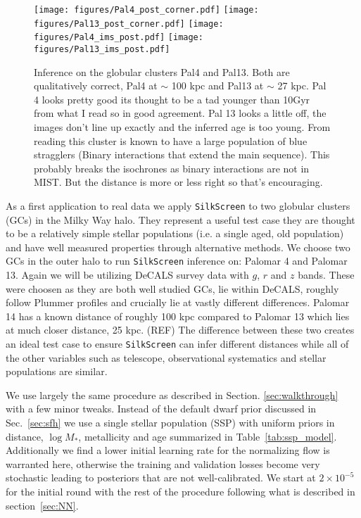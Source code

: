 \documentclass[twocolumn]{aastex631}
\newcommand{\code}[0]{\texttt{SilkScreen}}
\begin{document}
\begin{figure*}
    \centering
    \texttt{[image: figures/Pal4\_post\_corner.pdf]}
    \texttt{[image: figures/Pal13\_post\_corner.pdf]}
    \texttt{[image: figures/Pal4\_ims\_post.pdf]}
    \hspace{1cm}
    \texttt{[image: figures/Pal13\_ims\_post.pdf]}
    \caption{Inference on the globular clusters Pal4 and Pal13. Both are qualitatively correct, Pal4 at $\sim$ 100 kpc and Pal13 at $\sim$ 27 kpc. Pal 4 looks pretty good its thought to be a tad younger than 10Gyr from what I read so in good agreement. Pal 13 looks a little off, the images don't line up exactly and the inferred age is too young. From reading this cluster is known to have a large population of blue stragglers (Binary interactions that extend the main sequence). This probably breaks the isochrones as binary interactions are not in MIST. But the distance is more or less right so that's encouraging.}
    \label{fig:GCs}
\end{figure*}

As a first application to real data we apply \code{} to two globular clusters (GCs) in the Milky Way halo. They represent a useful test case they are thought to be a relatively simple stellar populations (i.e. a single aged, old population) and have well measured properties through alternative methods. We choose two GCs in the outer halo to run \code{} inference on: Palomar 4 and Palomar 13. Again we will be utilizing DeCALS survey data with $g$, $r$ and $z$ bands. These were choosen as they are both well studied GCs, lie within DeCALS, roughly follow Plummer profiles and crucially lie at vastly different differences. Palomar 14 has a known distance of roughly 100 kpc compared to Palomar 13 which lies at much closer distance, 25 kpc. (REF) The difference between these two creates an ideal test case to ensure \code{} can infer different distances while all of the other variables such as telescope, observational systematics and stellar populations are similar.

We use largely the same procedure as described in Section. \ref{sec:walkthrough} with a few minor tweaks. Instead of the default dwarf prior discussed in Sec.~\ref{sec:sfh} we use a single stellar population (SSP) with uniform priors in distance, $\log M_*$, metallicity and age summarized in Table~\ref{tab:ssp_model}. Additionally we find a lower initial learning rate for the normalizing flow is warranted here, otherwise the training and validation losses become very stochastic leading to posteriors that are not well-calibrated. We start at $2\times 10^{-5}$ for the initial round with the rest of the procedure following what is described in section~\ref{sec:NN}.
\end{document}
